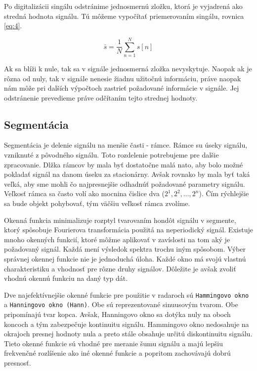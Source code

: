     \hspace{0.6cm}Po digitalizácii singálu odstránime jednosmernú zložku, ktorá je vyjadrená ako stredná hodnota signálu. Tú môžeme vypočítať priemerovaním singálu, rovnica \ref{eq:4}. 

    \begin{equation} \label{eq:4}
      \bar{s} = \frac{1}{N} \sum_{n=1}^{N} s[n]
    \end{equation}

    Ak sa blíži k nule, tak sa v signále jednosmerná zložka nevyskytuje. Naopak ak je rôzna od nuly, tak v signále nenesie žiadnu užitočnú informáciu, práve naopak nám môže pri dalších výpočtoch zastrieť požadované informácie v signále. Jej odstránenie prevedieme práve odčítaním tejto strednej hodnoty.\cite{zreopora}\newline

  \subsection{Segmentácia}

    \hspace{0.6cm}Segmentácia je delenie signálu na menšie časti - rámce. Rámce su úseky signálu, vzniknuté z pôvodného signálu. Toto rozdelenie potrebujeme pre dalšie zpracovanie.
    Dlžka rámcov by mala byť dostatočne malá nato, aby bolo možné pokladať signál na danom úseku za stacionárny. Avšak rovnako by mala byť taká veľká, aby sme mohli čo najpresnejšie odhadnúť požadované parametry signálu.
    Veľkosť rámca sa často volí ako mocnina čislice dva ($2^{1}, 2^{2}, ... , 2^{n}$). Čím rýchlejšie sa bude objekt pohybovať, tým väčšiu veľkosť rámca zvolíme\cite{zreopora}.

    \hspace{0.6cm}Okenná funkcia minimalizuje rozptyl tvarovaním hondôt signálu v segmente, ktorý spôsobuje Fourierova transformácia použitá na neperiodický signál.
    Existuje mnoho okenných funkcií, ktoré môžme aplikovať v zavíslosti na tom aký je požadovaný signál. Každá mení výsledok spektra trochu iným spôsobom. 
    Výber správnej okennej funkcie nie je jednoduchá úloha. Každé okno má svojú vlastnú charakteristiku a vhodnosť pre rôzne druhy signálov. Dôležite je avšak zvoliť vhodnú okennú funkciu na daný typ dát.

    Dve najefektívnejšie okenné funkcie pre použitie v radaroch sú \verb|Hammingovo okno| a \verb|Hanningovo okno (Hann)|. Obe sú reprezentované sinuusovým tvarom. Obe pripomínajú tvar kopca. Avšak, Hanningovo okno sa dotýka nuly na oboch koncoch a tým zabezpečuje kontinuitu signálu. Hammingovo okno nedosahuje na okrajoch presnej hodnoty nula a preto stále obsahuje určitú diskontinuitu signálu. Tieto okenné funkcie sú vhodné pre meranie šumu signálu a majú lepšiu frekvenčné rozlíšenie ako iné okenné funkcie a popritom zachovávajú dobrú presnosť.\cite{radarmatlab}\cite{undestandingfft}\newline

